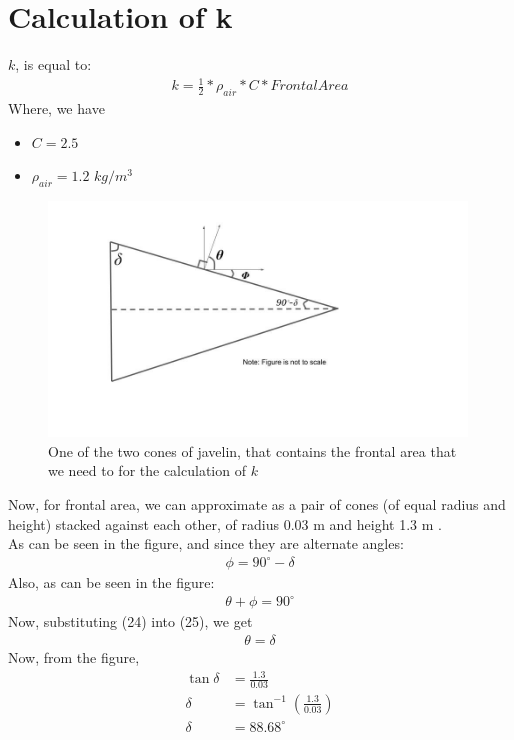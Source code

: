 \documentclass[12pt]{article}
\begin{document}
\section{Calculation of k}
$k$, is equal to:
\begin{align*}
    k = \frac{1}{2}*\rho_{air}*C*Frontal Area
\end{align*}
Where, we have 
\begin{itemize}
    \item $C = 2.5$ \cite{ref6}
    \item $\rho_{air} = 1.2\,\,kg/m^3$ \cite{ref7}
\end{itemize}
\begin{figure}[H]
    \centering
    \includegraphics[width=0.99\textwidth]{javelin_dgm.jpg}
    \caption{One of the two cones of javelin, that contains the frontal area that we need to for the calculation of $k$}
    \label{fig:javelin_dgm.JPEG}
\end{figure}
Now, for frontal area, we can approximate as a pair of cones (of equal radius and height) stacked against each other, of radius 0.03 m \cite{ref8} and height 1.3 m \cite{ref9}. \\
As can be seen in the figure, and since they are alternate angles:
\begin{align}
    \phi = 90^\circ - \delta
\end{align}
Also, as can be seen in the figure:
\begin{align}
    \theta + \phi = 90^\circ
\end{align}
Now, substituting (24) into (25), we get
\begin{align}
    \theta = \delta
\end{align}
Now, from the figure, 
\begin{align*}
    \tan\delta &= \frac{1.3}{0.03} \\
    \delta &= \tan^{-1}\left(\frac{1.3}{0.03}\right) \\
    \delta &= 88.68^\circ \\
\end{align*}
\end{document}
